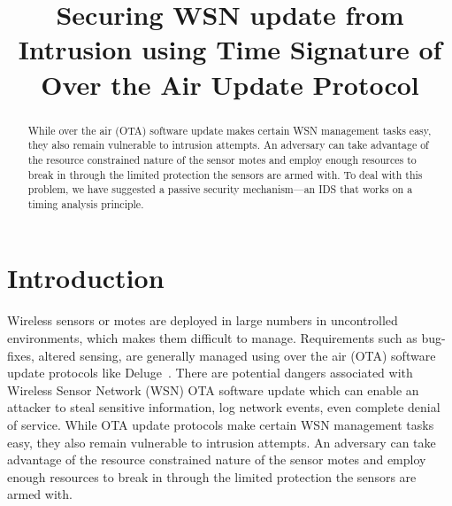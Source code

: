 \documentclass[conference]{IEEEtran}
\begin{document}
\title{Securing WSN update from Intrusion using Time Signature of Over the Air Update Protocol}

\author{
		}


\maketitle

\begin{abstract}
While over the air (OTA) software update makes certain WSN management tasks easy, they also remain vulnerable to intrusion attempts.
An adversary can take advantage of the resource constrained nature of the sensor motes and employ enough resources to break in through the limited protection the sensors are armed with.
To deal with this problem, we have suggested a passive security mechanism---an IDS that works on a timing analysis principle.
\end{abstract}

\section{Introduction}
\label{sec:intro}

Wireless sensors or motes are deployed in large numbers in uncontrolled environments, which makes them difficult to manage.
Requirements such as bug-fixes, altered sensing, are generally managed using over the air (OTA) software update protocols like Deluge~\cite{1031506}.
There are potential dangers associated with Wireless Sensor Network (WSN) OTA software update which can enable an attacker to steal sensitive information, log network events, even complete denial of service.
While OTA update protocols make certain WSN management tasks easy, they also remain vulnerable to intrusion attempts.
An adversary can take advantage of the resource constrained nature of the sensor motes and employ enough resources to break in through the limited protection the sensors are armed with.
\end{document}

